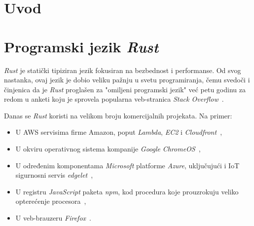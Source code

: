 \documentclass[12pt,oneside]{memoir}
\begin{document}
\frontmatter
\naslovna
\komisija
\apstrakt
\tableofcontents*

\mainmatter

\chapter{Uvod}
\chapter{Programski jezik \emph{Rust}}
\emph{Rust} je statički tipiziran jezik  fokusiran na bezbednost i
performanse. Od svog nastanka, ovaj jezik
je dobio veliku pažnju u svetu programiranja, čemu svedoči i činjenica da je
\emph{Rust} proglašen za "omiljeni programski jezik" već petu godinu za redom
u anketi koju je sprovela popularna veb-stranica \emph{Stack Overflow}~\cite{mostloved_so}.

Danas se \emph{Rust} koristi na velikom broju komercijalnih projekata. Na primer:

\begin{itemize}
    \item U AWS servisima firme Amazon, poput \emph{Lambda}, \emph{EC2}
        i \emph{Cloudfront}~\cite{aws},
    \item U okviru operativnog sistema kompanije \textit{Google}
        \emph{ChromeOS}~\cite{crosvm},
    \item U određenim komponentama \textit{Microsoft} platforme \emph{Azure}, uključujući i
        IoT sigurnosni servis \emph{edgelet}~\cite{edgelet},
    \item U registru \emph{JavaScript} paketa \emph{npm},
        kod procedura koje prouzrokuju veliko opterećenje procesora~\cite{npm},
    \item U veb-brauzeru \textit{Firefox}~\cite{firefox_rust}.
\end{itemize}
\end{document}
